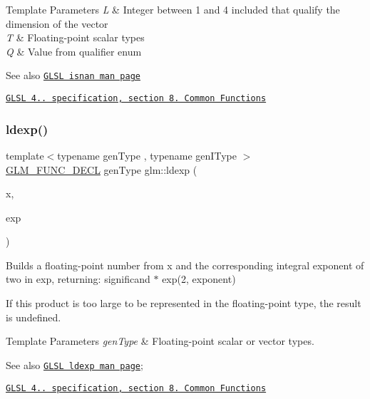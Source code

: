 \begin{DoxyTemplParams}{Template Parameters}
{\em L} & Integer between 1 and 4 included that qualify the dimension of the vector \\
\hline
{\em T} & Floating-\/point scalar types \\
\hline
{\em Q} & Value from qualifier enum\\
\hline
\end{DoxyTemplParams}
\begin{DoxySeeAlso}{See also}
\href{http://www.opengl.org/sdk/docs/manglsl/xhtml/isnan.xml}{\tt G\+L\+SL isnan man page} 

\href{http://www.opengl.org/registry/doc/GLSLangSpec.4.20.8.pdf}{\tt G\+L\+SL 4.. specification, section 8. Common Functions} 
\end{DoxySeeAlso}
\mbox{\label{group__core__func__common_ga52e319d7289b849ec92055abd4830533}} 
\subsubsection{\texorpdfstring{ldexp()}{ldexp()}}
{\footnotesize\ttfamily template$<$typename gen\+Type , typename gen\+I\+Type $>$ \\
\hyperlink{setup_8hpp_ab2d052de21a70539923e9bcbf6e83a51}{G\+L\+M\+\_\+\+F\+U\+N\+C\+\_\+\+D\+E\+CL} gen\+Type glm\+::ldexp (\begin{DoxyParamCaption}\item[{gen\+Type const \&}]{x,  }\item[{gen\+I\+Type const \&}]{exp }\end{DoxyParamCaption})}

Builds a floating-\/point number from x and the corresponding integral exponent of two in exp, returning\+: significand $\ast$ exp(2, exponent)

If this product is too large to be represented in the floating-\/point type, the result is undefined.


\begin{DoxyTemplParams}{Template Parameters}
{\em gen\+Type} & Floating-\/point scalar or vector types.\\
\hline
\end{DoxyTemplParams}
\begin{DoxySeeAlso}{See also}
\href{http://www.opengl.org/sdk/docs/manglsl/xhtml/ldexp.xml}{\tt G\+L\+SL ldexp man page}; 

\href{http://www.opengl.org/registry/doc/GLSLangSpec.4.20.8.pdf}{\tt G\+L\+SL 4.. specification, section 8. Common Functions} 
\end{DoxySeeAlso}
\mbox{\label{group__core__func__common_ga98caa7f95a94c86a86ebce893a45326c}} 
